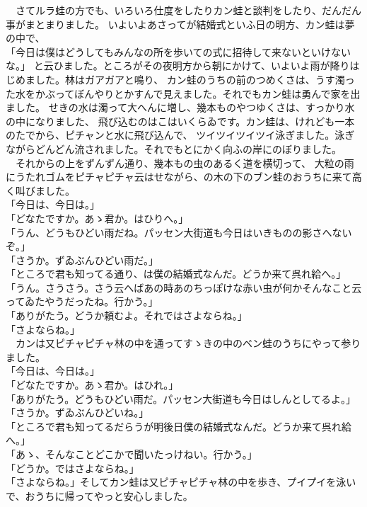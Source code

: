 \documentclass[
a4paper,
book]
{tarticle}
\begin{document}
　さてルラ蛙の方でも、いろいろ仕度をしたりカン蛙と談判をしたり、だんだん事がまとまりました。
いよいよあさってが結婚式といふ日の明方、カン蛙は夢の中で、\\
「今日は僕はどうしてもみんなの所を歩いての式に招待して来ないといけないな。」
と云ひました。ところがその夜明方から朝にかけて、いよいよ雨が降りはじめました。林はガアガアと鳴り、
カン蛙のうちの前のつめくさは、うす濁った水をかぶってぼんやりとかすんで見えました。それでもカン蛙は勇んで家を出ました。
せきの水は濁って大へんに増し、幾本ものやつゆくさは、すっかり水の中になりました、
飛び込むのはこはいくらゐです。カン蛙は、けれども一本のたでから、ピチャンと水に飛び込んで、
ツイツイツイツイ泳ぎました。泳ぎながらどんどん流されました。それでもとにかく向ふの岸にのぼりました。\\
　それからの上をずんずん通り、幾本もの虫のあるく道を横切って、
大粒の雨にうたれゴムをピチャピチャ云はせながら、の木の下のブン蛙のおうちに来て高く叫びました。\\
「今日は、今日は。」\\
「どなたですか。あゝ君か。はひりへ。」\\
「うん、どうもひどい雨だね。パッセン大街道も今日はいきものの影さへないぞ。」\\
「さうか。ずゐぶんひどい雨だ。」\\
「ところで君も知ってる通り、は僕の結婚式なんだ。どうか来て呉れ給へ。」\\
「うん。さうさう。さう云へばあの時あのちっぽけな赤い虫が何かそんなこと云ってゐたやうだったね。行かう。」\\
「ありがたう。どうか頼むよ。それではさよならね。」\\
「さよならね。」\\
　カンは又ピチャピチャ林の中を通ってすゝきの中のベン蛙のうちにやって参りました。\\
「今日は、今日は。」\\
「どなたですか。あゝ君か。はひれ。」\\
「ありがたう。どうもひどい雨だ。パッセン大街道も今日はしんとしてるよ。」\\
「さうか。ずゐぶんひどいね。」\\
「ところで君も知ってるだらうが明後日僕の結婚式なんだ。どうか来て呉れ給へ。」\\
「あゝ、そんなことどこかで聞いたっけねい。行かう。」\\
「どうか。ではさよならね。」\\
「さよならね。」そしてカン蛙は又ピチャピチャ林の中を歩き、プイプイを泳いで、おうちに帰ってやっと安心しました。\\
\end{document}
